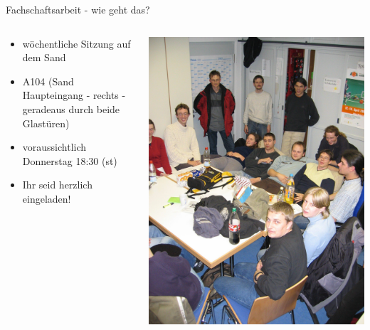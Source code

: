 \documentclass{beamer}
\begin{document}
	\begin{frame}{Fachschaftsarbeit - wie geht das?}
		\begin{columns}
			\begin{column}{.5\linewidth}
				\begin{itemize}
					\item wöchentliche Sitzung auf dem Sand
					\item A104 (Sand Haupteingang - rechts - geradeaus durch beide Glastüren)
					\item voraussichtlich Donnerstag 18:30 (st) %
					\item Ihr seid herzlich eingeladen!
				\end{itemize}
			\end{column}
			\begin{column}{0.5\linewidth}
				\includegraphics[width=\linewidth]{Sitzung.jpg}
			\end{column}
		\end{columns}
	\end{frame}
\end{document}
